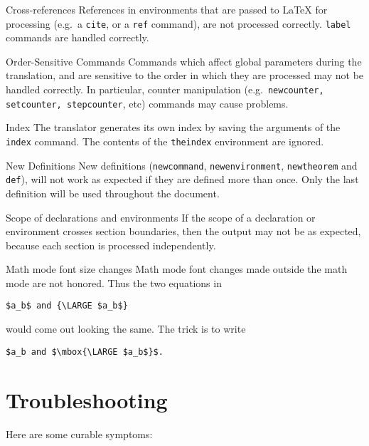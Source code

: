 \begin{htmllist}
\item [Cross-references\index{cross-references}]
References in environments that are passed to LaTeX  for processing
(e.g.\ a \texttt{cite}, or a \texttt{ref} command), are not processed
correctly.
\texttt{label} commands are handled correctly.

\item[Order-Sensitive Commands]
Commands which affect global parameters during the translation,
and are sensitive to the order in which they are processed may
not be handled correctly. In particular, counter manipulation
(e.g.\ \texttt{newcounter, setcounter, stepcounter}, etc) 
commands may cause problems.

\item [Index\index{index}]
The translator generates its own index by saving the arguments  of 
the \texttt{index} command. The contents of the \texttt{theindex}
environment are ignored.

\item[New Definitions\index{new definitions}]
New definitions (\texttt{newcommand}, \texttt{newenvironment}, 
\texttt{newtheorem} and \texttt{def}),
will not work as expected if they are defined more than once.
Only the last definition will be used throughout the document.

\item [Scope of declarations and environments]
If the scope of a declaration or environment crosses section
boundaries, then the output may not be as expected, because each
section is processed independently.

\item [Math mode font size changes]  Math mode font changes
made outside the math mode are not honored.  Thus the two equations
in
\begin{verbatim}
$a_b$ and {\LARGE $a_b$}
\end{verbatim}
would come out looking the same.  The trick is to write
\begin{verbatim}
$a_b and $\mbox{\LARGE $a_b$}$.
\end{verbatim}

\end{htmllist}
\section{Troubleshooting}
  
Here are some curable symptoms:

